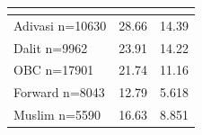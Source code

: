 {
\def\sym#1{\ifmmode^{#1}\else\(^{#1}\)\fi}
\begin{tabular}{l*{2}{c}}
\hline\hline
            &&\\
\hline
\hline
Adivasi n=10630&       28.66         &       14.39         \\
Dalit n=9962&       23.91         &       14.22         \\
OBC n=17901 &       21.74         &       11.16         \\
Forward n=8043&       12.79         &       5.618         \\
Muslim n=5590&       16.63         &       8.851         \\
\hline\hline
\end{tabular}
}
